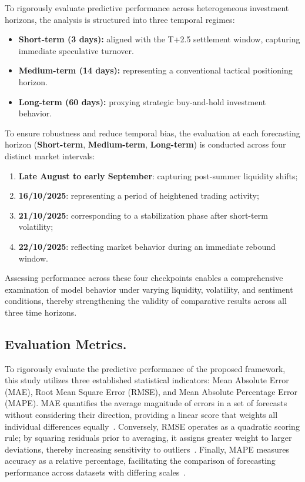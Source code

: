 \documentclass{ieeeaccess}
\begin{document}
To rigorously evaluate predictive performance across heterogeneous investment horizons, the 
analysis is structured into three temporal regimes:
\begin{itemize}
    \item \textbf{Short-term (3 days):} aligned with the T+2.5 settlement window, capturing immediate speculative turnover.
    \item \textbf{Medium-term (14 days):} representing a conventional tactical positioning horizon.
    \item \textbf{Long-term (60 days):} proxying strategic buy-and-hold investment behavior.
\end{itemize}

To ensure robustness and reduce temporal bias, the evaluation at each forecasting horizon (\textbf{Short-term}, \textbf{Medium-term}, \textbf{Long-term}) is conducted across four distinct market intervals:
\begin{enumerate}
    \item \textbf{Late August to early September}: capturing post-summer liquidity shifts;
    \item \textbf{16/10/2025}: representing a period of heightened trading activity;
    \item \textbf{21/10/2025}: corresponding to a stabilization phase after short-term volatility;
    \item \textbf{22/10/2025}: reflecting market behavior during an immediate rebound window.
\end{enumerate}
Assessing performance across these four checkpoints enables a comprehensive examination of model behavior under varying liquidity, volatility, and sentiment conditions, thereby strengthening the validity of comparative results across all three time horizons.


\subsection{Evaluation Metrics.} 
To rigorously evaluate the predictive performance of the proposed framework, this study utilizes three established statistical indicators: Mean Absolute Error (MAE), Root Mean Square Error (RMSE), and Mean Absolute Percentage Error (MAPE). MAE quantifies the average magnitude of errors in a set of forecasts without considering their direction, providing a linear score that weights all individual differences equally~\cite{willmott2005advantages}. Conversely, RMSE operates as a quadratic scoring rule; by squaring residuals prior to averaging, it assigns greater weight to larger deviations, thereby increasing sensitivity to outliers~\cite{chai2014root}. Finally, MAPE measures accuracy as a relative percentage, facilitating the comparison of forecasting performance across datasets with differing scales~\cite{hyndman2006another}.
\end{document}
